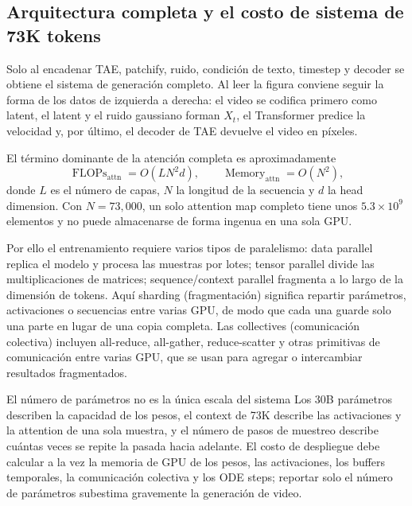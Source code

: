 \subsection{Arquitectura completa y el costo de sistema de 73K tokens}

Solo al encadenar TAE, patchify, ruido, condición de texto, timestep y decoder se obtiene el sistema de generación completo. Al leer la figura conviene seguir la forma de los datos de izquierda a derecha: el video se codifica primero como latent, el latent y el ruido gaussiano forman $X_t$, el Transformer predice la velocidad y, por último, el decoder de TAE devuelve el video en píxeles.


El término dominante de la atención completa es aproximadamente
\[
\operatorname{FLOPs}_{\mathrm{attn}}=O(LN^2d),
\qquad
\operatorname{Memory}_{\mathrm{attn}}=O(N^2),
\]
donde $L$ es el número de capas, $N$ la longitud de la secuencia y $d$ la head dimension. Con $N=73{,}000$, un solo attention map completo tiene unos $5.3\times10^9$ elementos y no puede almacenarse de forma ingenua en una sola GPU.

Por ello el entrenamiento requiere varios tipos de paralelismo: data parallel replica el modelo y procesa las muestras por lotes; tensor parallel divide las multiplicaciones de matrices; sequence/context parallel fragmenta a lo largo de la dimensión de tokens. Aquí sharding (fragmentación) significa repartir parámetros, activaciones o secuencias entre varias GPU, de modo que cada una guarde solo una parte en lugar de una copia completa. Las collectives (comunicación colectiva) incluyen all-reduce, all-gather, reduce-scatter y otras primitivas de comunicación entre varias GPU, que se usan para agregar o intercambiar resultados fragmentados.

\begin{warningbox}{El número de parámetros no es la única escala del sistema}
Los 30B parámetros describen la capacidad de los pesos, el context de 73K describe las activaciones y la attention de una sola muestra, y el número de pasos de muestreo describe cuántas veces se repite la pasada hacia adelante. El costo de despliegue debe calcular a la vez la memoria de GPU de los pesos, las activaciones, los buffers temporales, la comunicación colectiva y los ODE steps; reportar solo el número de parámetros subestima gravemente la generación de video.
\end{warningbox}

